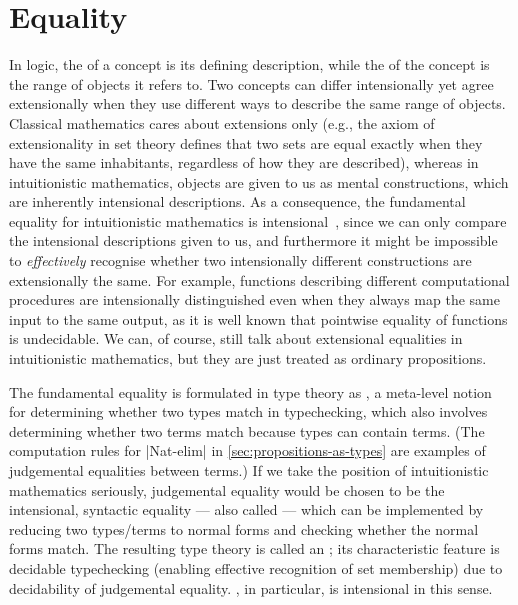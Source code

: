 \section{Equality}
\label{sec:equality}

In logic, the  of a concept is its defining description, while the  of the concept is the range of objects it refers to.
Two concepts can differ intensionally yet agree extensionally when they use different ways to describe the same range of objects.
Classical mathematics cares about extensions only (e.g., the axiom of extensionality in set theory defines that two sets are equal exactly when they have the same inhabitants, regardless of how they are described), whereas in intuitionistic mathematics, objects are given to us as mental constructions, which are inherently intensional descriptions.
As a consequence, the fundamental equality for intuitionistic mathematics is intensional~\citep[Section~1.2]{Dummett-intuitionism}, since we can only compare the intensional descriptions given to us, and furthermore it might be impossible to \emph{effectively} recognise whether two intensionally different constructions are extensionally the same.
For example, functions describing different computational procedures are intensionally distinguished even when they always map the same input to the same output, as it is well known that pointwise equality of functions is undecidable.
We can, of course, still talk about extensional equalities in intuitionistic mathematics, but they are just treated as ordinary propositions.

The fundamental equality is formulated in type theory as , a meta-level notion for determining whether two types match in typechecking, which also involves determining whether two terms match because types can contain terms.
(The computation rules for |Nat-elim| in \autoref{sec:propositions-as-types} are examples of judgemental equalities between terms.)
If we take the position of intuitionistic mathematics seriously, judgemental equality would be chosen to be the intensional, syntactic equality --- also called  --- which can be implemented by reducing two types/terms to normal forms and checking whether the normal forms match.
The resulting type theory is called an ; its characteristic feature is decidable typechecking (enabling effective recognition of set membership) due to decidability of judgemental equality.
\Agda, in particular, is intensional in this sense.

